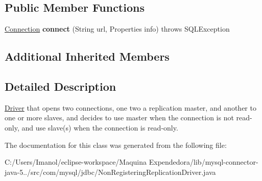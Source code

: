 \subsection*{Public Member Functions}
\begin{DoxyCompactItemize}
\item 
\mbox{\label{classcom_1_1mysql_1_1jdbc_1_1_non_registering_replication_driver_acf62fdba664b767dd0c4e791459aa9a7}} 
\mbox{\hyperlink{interfacecom_1_1mysql_1_1jdbc_1_1_connection}{Connection}} {\bfseries connect} (String url, Properties info)  throws S\+Q\+L\+Exception 
\end{DoxyCompactItemize}
\subsection*{Additional Inherited Members}


\subsection{Detailed Description}
\mbox{\hyperlink{classcom_1_1mysql_1_1jdbc_1_1_driver}{Driver}} that opens two connections, one two a replication master, and another to one or more slaves, and decides to use master when the connection is not read-\/only, and use slave(s) when the connection is read-\/only. 

The documentation for this class was generated from the following file\+:\begin{DoxyCompactItemize}
\item 
C\+:/\+Users/\+Imanol/eclipse-\/workspace/\+Maquina Expendedora/lib/mysql-\/connector-\/java-\/5../src/com/mysql/jdbc/Non\+Registering\+Replication\+Driver.\+java\end{DoxyCompactItemize}
